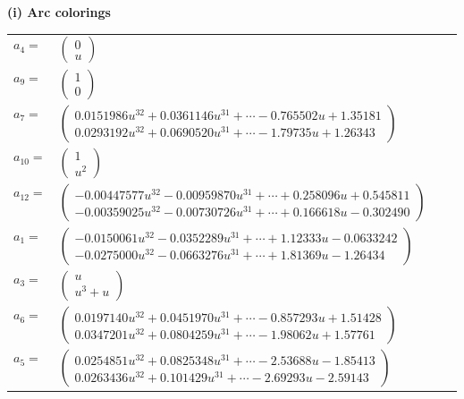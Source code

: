 \documentclass[1p]{elsarticle_modified}
\theoremstyle{definition}
\begin{document}
\flushleft \textbf{(i) Arc colorings}\\
\begin{tabular}{m{7pt} m{180pt} m{7pt} m{180pt} }
\flushright $a_{4}=$&$\begin{pmatrix}0\\u\end{pmatrix}$ \\
\flushright $a_{9}=$&$\begin{pmatrix}1\\0\end{pmatrix}$ \\
\flushright $a_{7}=$&$\begin{pmatrix}0.0151986 u^{32}+0.0361146 u^{31}+\cdots-0.765502 u+1.35181\\0.0293192 u^{32}+0.0690520 u^{31}+\cdots-1.79735 u+1.26343\end{pmatrix}$ \\
\flushright $a_{10}=$&$\begin{pmatrix}1\\u^2\end{pmatrix}$ \\
\flushright $a_{12}=$&$\begin{pmatrix}-0.00447577 u^{32}-0.00959870 u^{31}+\cdots+0.258096 u+0.545811\\-0.00359025 u^{32}-0.00730726 u^{31}+\cdots+0.166618 u-0.302490\end{pmatrix}$ \\
\flushright $a_{1}=$&$\begin{pmatrix}-0.0150061 u^{32}-0.0352289 u^{31}+\cdots+1.12333 u-0.0633242\\-0.0275000 u^{32}-0.0663276 u^{31}+\cdots+1.81369 u-1.26434\end{pmatrix}$ \\
\flushright $a_{3}=$&$\begin{pmatrix}u\\u^3+u\end{pmatrix}$ \\
\flushright $a_{6}=$&$\begin{pmatrix}0.0197140 u^{32}+0.0451970 u^{31}+\cdots-0.857293 u+1.51428\\0.0347201 u^{32}+0.0804259 u^{31}+\cdots-1.98062 u+1.57761\end{pmatrix}$ \\
\flushright $a_{5}=$&$\begin{pmatrix}0.0254851 u^{32}+0.0825348 u^{31}+\cdots-2.53688 u-1.85413\\0.0263436 u^{32}+0.101429 u^{31}+\cdots-2.69293 u-2.59143\end{pmatrix}$ \\

\end{tabular}
\end{document}
